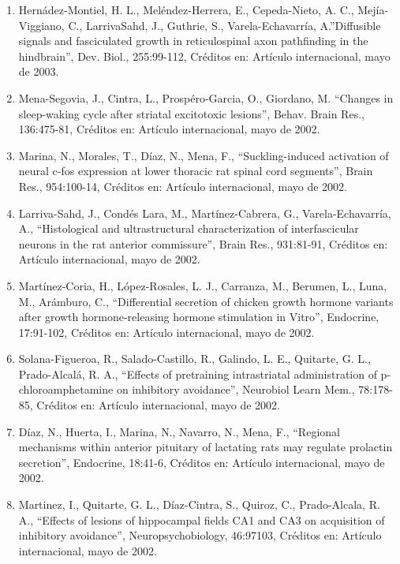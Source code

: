 \documentclass[12pt]{article}
\begin{document}
\begin{enumerate}
\item Hernádez-Montiel, H. L., Meléndez-Herrera, E., Cepeda-Nieto, A. C., Mejía-Viggiano, C., LarrivaSahd, J., Guthrie, S., 
Varela-Echavarría, A.”Diffusible signals and fasciculated growth in reticulospinal axon pathfinding in the hindbrain”, Dev. Biol., 
255:99-112, Créditos en: Artículo internacional, mayo de 2003.

\item Mena-Segovia, J., Cintra, L., Prospéro-Garcia, O., Giordano, M. “Changes in sleep-waking cycle after striatal excitotoxic 
lesions”, 
Behav. Brain Res., 136:475-81, Créditos en: Artículo internacional, mayo de 2002.

\item Marina, N., Morales, T., Díaz, N., Mena, F., “Suckling-induced activation of neural c-fos expression at lower thoracic rat spinal 
cord segments”, Brain Res., 954:100-14, Créditos en: Artículo internacional, mayo de 2002.

\item Larriva-Sahd, J., Condés Lara, M., Martínez-Cabrera, G., Varela-Echavarría, A., “Histological and ultrastructural 
characterization 
of interfascicular neurons in the rat anterior commissure”, Brain Res., 931:81-91, Créditos en: Artículo internacional, mayo de 2002.

\item Martínez-Coria, H., López-Rosales, L. J., Carranza, M., Berumen, L., Luna, M., Arámburo, C., “Differential secretion of chicken 
growth hormone variants after growth hormone-releasing hormone stimulation in Vitro”, Endocrine, 17:91-102, Créditos en: Artículo 
internacional, mayo de 2002.

\item Solana-Figueroa, R., Salado-Castillo, R., Galindo, L. E., Quitarte, G. L., Prado-Alcalá, R. A., “Effects of pretraining 
intrastriatal administration of p-chloroamphetamine on inhibitory avoidance”, Neurobiol Learn Mem., 78:178-85, Créditos en: Artículo 
internacional, mayo de 2002.

\item Díaz, N., Huerta, I., Marina, N., Navarro, N., Mena, F., “Regional mechanisms within anterior pituitary of lactating rats may 
regulate prolactin secretion”, Endocrine, 18:41-6, Créditos en: Artículo internacional, mayo de 2002.

\item Martinez, I., Quitarte, G. L., Díaz-Cintra, S., Quiroz, C., Prado-Alcala, R. A., “Effects of lesions of hippocampal fields CA1 
and 
CA3 on acquisition of inhibitory avoidance”, Neuropsychobiology, 46:97103, Créditos en: Artículo internacional, mayo de 2002.


\end{enumerate}
\end{document}

